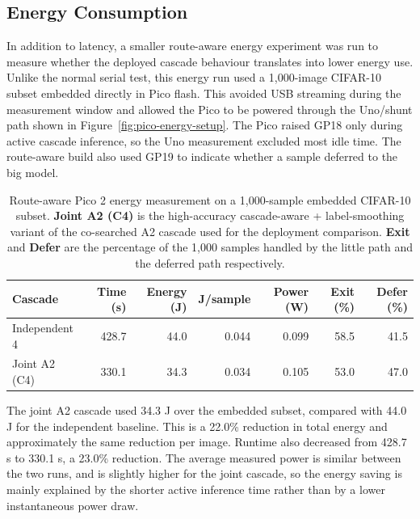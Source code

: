\documentclass[conference]{IEEEtran}
\begin{document}
\subsection{Energy Consumption}

In addition to latency, a smaller route-aware energy experiment was run to
measure whether the deployed cascade behaviour translates into lower energy
use. Unlike the normal serial test, this energy run used a 1,000-image CIFAR-10
subset embedded directly in Pico flash. This avoided USB streaming during the
measurement window and allowed the Pico to be powered through the Uno/shunt
path shown in Figure~\ref{fig:pico-energy-setup}. The Pico raised GP18 only
during active cascade inference, so the Uno measurement excluded most idle
time. The route-aware build also used GP19 to indicate whether a sample
deferred to the big model.

\begin{table}[t]
\centering
\caption{Route-aware Pico 2 energy measurement on a 1{,}000-sample embedded
CIFAR-10 subset. \textbf{Joint A2 (C4)} is the high-accuracy
cascade-aware + label-smoothing variant of the co-searched A2 cascade used
for the deployment comparison. \textbf{Exit} and \textbf{Defer} are the
percentage of the 1{,}000 samples handled by the little path and the
deferred path respectively.}
\label{tab:pico-energy}
\small
\begin{tabular}{@{}lrrrrrr@{}}
\toprule
\textbf{Cascade}  & \textbf{Time (s)} & \textbf{Energy (J)} &
\textbf{J/sample} & \textbf{Power (W)} & \textbf{Exit (\%)} & \textbf{Defer (\%)} \\
\midrule
Independent 4     & 428.7 & 44.0 & 0.044 & 0.099 & 58.5 & 41.5 \\
Joint A2 (C4)     & 330.1 & 34.3 & 0.034 & 0.105 & 53.0 & 47.0 \\
\bottomrule
\end{tabular}
\end{table}

The joint A2 cascade used 34.3 J over the embedded subset, compared with
44.0 J for the independent baseline. This is a 22.0\% reduction in total energy
and approximately the same reduction per image. Runtime also decreased from
428.7 s to 330.1 s, a 23.0\% reduction. The average measured power is similar
between the two runs, and is slightly higher for the joint cascade, so the
energy saving is mainly explained by the shorter active inference time rather
than by a lower instantaneous power draw.
\end{document}
